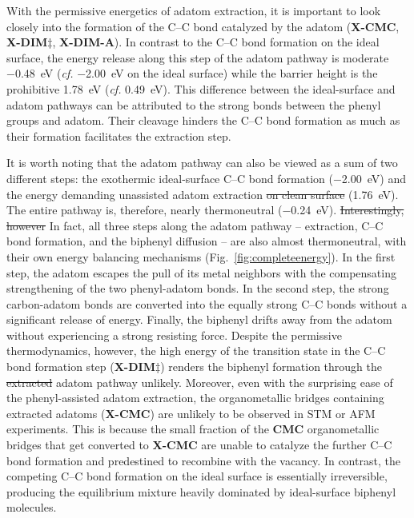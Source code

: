 \documentclass[aps,prb,amsmath,amssymb,11pt]{revtex4-1}
\newcommand{\zhzh}{\color{blue}}
\begin{document}
With the permissive energetics of adatom extraction, it is important to look closely into the formation of the C--C bond catalyzed by the adatom (\textbf{X-CMC}, \textbf{X-DIM$\ddagger$}, \textbf{X-DIM-A}).
In contrast to the C--C bond formation on the ideal surface, the energy release along this step of the adatom pathway is moderate \SI{-0.48}{\electronvolt} (\textit{cf.} \SI{-2.00}{\electronvolt} on the ideal surface) while the barrier height is the prohibitive \SI{1.78}{\electronvolt} (\textit{cf.} \SI{0.49}{\electronvolt}). 
This difference between the ideal-surface and adatom pathways can be attributed to the strong bonds between the phenyl groups and adatom.
Their cleavage  hinders the C--C bond formation as much as their formation facilitates the extraction step.

It is worth noting that the adatom pathway can also be viewed as a sum of two different steps: the exothermic ideal-surface C--C bond formation (\SI{-2.00}{\electronvolt}) and the energy demanding {\zhzh unassisted} adatom extraction \sout{on clean surface} (\SI{1.76}{\electronvolt}). 
The entire pathway is, therefore, nearly thermoneutral (\SI{-0.24}{\electronvolt}). 
\sout{Interestingly, however} {\zhzh In fact}, all three steps along the adatom pathway -- extraction, C--C bond
formation, and the biphenyl diffusion -- are also almost thermoneutral, with their own energy balancing mechanisms (Fig.~\ref{fig:completeenergy}). 
In the first step, the adatom escapes the pull of its metal neighbors with the compensating strengthening of the two phenyl-adatom bonds. In the second step, the strong carbon-adatom bonds are converted into the equally strong C--C bonds without a significant release of energy. Finally, the biphenyl drifts away from the adatom without experiencing a strong resisting force. Despite the permissive thermodynamics, however, the high energy of the transition state in the C--C bond formation step (\textbf{X-DIM$\ddagger$}) renders the biphenyl formation through the \sout{extracted} adatom pathway unlikely.
Moreover, even with the surprising ease of the phenyl-assisted adatom extraction, the organometallic bridges containing extracted adatoms (\textbf{X-CMC}) are unlikely to be observed in STM or AFM experiments. This is because the small fraction of the \textbf{CMC} organometallic bridges that get converted to \textbf{X-CMC} are unable to catalyze the further C--C bond formation and predestined to recombine with the vacancy. In contrast, the competing C--C bond formation on the ideal surface is essentially irreversible, producing the equilibrium mixture heavily dominated by ideal-surface biphenyl molecules.
\end{document}
